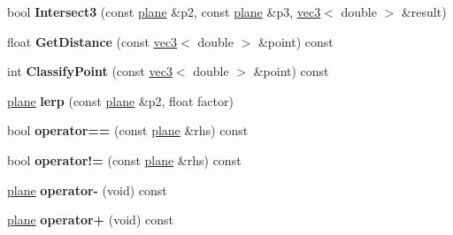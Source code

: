 \begin{DoxyCompactItemize}
\item 
\hypertarget{classmath_1_1plane_a92792c99386ff63af26afc04a2b153cf}{
bool {\bfseries Intersect3} (const \hyperlink{classmath_1_1plane}{plane} \&p2, const \hyperlink{classmath_1_1plane}{plane} \&p3, \hyperlink{classmath_1_1vec3}{vec3}$<$ double $>$ \&result)}
\label{classmath_1_1plane_a92792c99386ff63af26afc04a2b153cf}

\item 
\hypertarget{classmath_1_1plane_af9691fa498bdabbec6cccf27bc53215d}{
float {\bfseries GetDistance} (const \hyperlink{classmath_1_1vec3}{vec3}$<$ double $>$ \&point) const }
\label{classmath_1_1plane_af9691fa498bdabbec6cccf27bc53215d}

\item 
\hypertarget{classmath_1_1plane_ab90dcc5fdb973b1a5115d48fb3cee00a}{
int {\bfseries ClassifyPoint} (const \hyperlink{classmath_1_1vec3}{vec3}$<$ double $>$ \&point) const }
\label{classmath_1_1plane_ab90dcc5fdb973b1a5115d48fb3cee00a}

\item 
\hypertarget{classmath_1_1plane_affa8cd87ad8b3da63511d526fd81a1a6}{
\hyperlink{classmath_1_1plane}{plane} {\bfseries lerp} (const \hyperlink{classmath_1_1plane}{plane} \&p2, float factor)}
\label{classmath_1_1plane_affa8cd87ad8b3da63511d526fd81a1a6}

\item 
\hypertarget{classmath_1_1plane_ac5c24435016da495c52e9a7ca9cc1f08}{
bool {\bfseries operator==} (const \hyperlink{classmath_1_1plane}{plane} \&rhs) const }
\label{classmath_1_1plane_ac5c24435016da495c52e9a7ca9cc1f08}

\item 
\hypertarget{classmath_1_1plane_a45108625f3dc606b7df31386cce2f1c2}{
bool {\bfseries operator!=} (const \hyperlink{classmath_1_1plane}{plane} \&rhs) const }
\label{classmath_1_1plane_a45108625f3dc606b7df31386cce2f1c2}

\item 
\hypertarget{classmath_1_1plane_a4c9f64519742f6d7d0370a62101733c4}{
\hyperlink{classmath_1_1plane}{plane} {\bfseries operator-\/} (void) const }
\label{classmath_1_1plane_a4c9f64519742f6d7d0370a62101733c4}

\item 
\hypertarget{classmath_1_1plane_a57123617c9e3bfaed24cc655205b17ed}{
\hyperlink{classmath_1_1plane}{plane} {\bfseries operator+} (void) const }
\label{classmath_1_1plane_a57123617c9e3bfaed24cc655205b17ed}

\end{DoxyCompactItemize}
